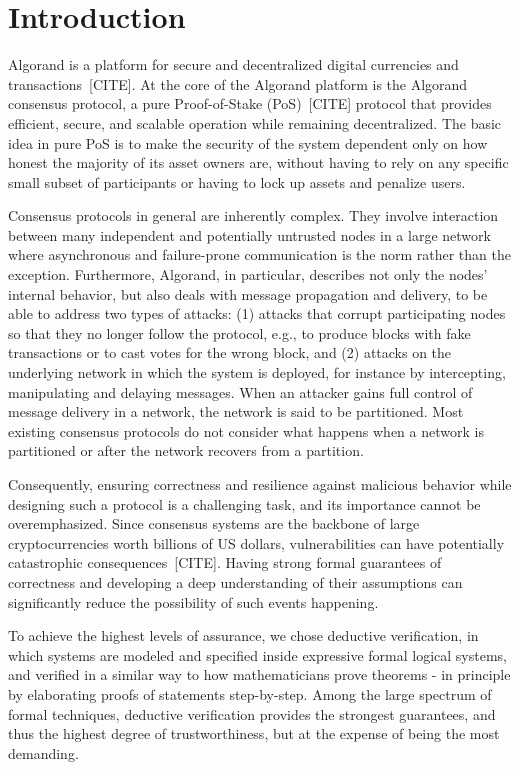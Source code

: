\section{Introduction}

Algorand is a platform for secure and decentralized digital currencies and transactions~[CITE]. At the core of the Algorand platform is the Algorand consensus protocol, a pure Proof-of-Stake (PoS)~[CITE] protocol that provides efficient, secure, and scalable operation while remaining decentralized. The basic idea in pure PoS is to make the security of the system dependent only on how honest the majority of its asset owners are, without having to rely on any specific small subset of participants or having to lock up assets and penalize users.

Consensus protocols in general are inherently complex. They involve interaction between many independent and potentially untrusted nodes in a large network where asynchronous and failure-prone communication is the norm rather than the exception. Furthermore, Algorand, in particular, describes not only the nodes' internal behavior, but also deals with message propagation and delivery, to be able to address two types of attacks: (1) attacks that corrupt participating nodes so that they no longer follow the protocol, e.g., to produce blocks with fake transactions or to cast votes for the wrong block, and (2) attacks on the underlying network in which the system is deployed, for instance by intercepting, manipulating and delaying messages. When an attacker gains full control of message delivery in a network, the network is said to be partitioned. Most existing consensus protocols do not consider what happens when a network is partitioned or after the network recovers from a partition.

Consequently, ensuring correctness and resilience against malicious behavior while designing such a protocol is a challenging task, and its importance cannot be overemphasized. Since consensus systems are the backbone of large cryptocurrencies worth billions of US dollars, vulnerabilities can have potentially catastrophic consequences~[CITE]. Having strong formal guarantees of correctness and developing a deep understanding of their assumptions can significantly reduce the possibility of such events happening.

To achieve the highest levels of assurance, we chose deductive verification, in which systems are modeled and specified inside expressive formal logical systems, and verified in a similar way to how mathematicians prove theorems - in principle by elaborating proofs of statements step-by-step. Among the large spectrum of formal techniques, deductive verification provides the strongest guarantees, and thus the highest degree of trustworthiness, but at the expense of being the most demanding. %

